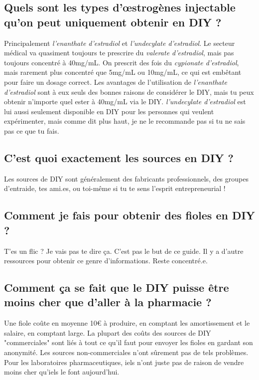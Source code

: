 \documentclass{article}
\begin{document}
\subsection{Quels sont les types d'œstrogènes injectable qu'on peut uniquement obtenir en DIY ?}

Principalement \textit{l'enanthate d'estradiol} et \textit{l'undecylate d'estradiol}. Le secteur médical va quasiment toujours te prescrire du \textit{valerate d'estradiol}, mais pas toujours concentré à 40mg/mL. On prescrit des fois du \textit{cypionate d'estradiol}, mais rarement plus concentré que 5mg/mL ou 10mg/mL, ce qui est embêtant pour faire un dosage correct. Les avantages de l'utilisation de \textit{l'enanthate d'estradiol} sont à eux seuls des bonnes raisons de considérer le DIY, mais tu peux obtenir n'importe quel ester à 40mg/mL via le DIY. \textit{l'undecylate d'estradiol} est lui aussi seulement disponible en DIY pour les personnes qui veulent expérimenter, mais comme dit plus haut, je ne le recommande pas si tu ne sais pas ce que tu fais.

\subsection{C'est quoi exactement les sources en DIY ?}

Les sources de DIY sont généralement des fabricants professionnels, des groupes d'entraide, tes ami.es, ou toi-même si tu te sens l'esprit entrepreneurial !

\subsection{Comment je fais pour obtenir des fioles en DIY ?}

T'es un flic ? Je vais pas te dire ça. C'est pas le but de ce guide. Il y a d'autre ressources pour obtenir ce genre d'informations. Reste concentré.e.

\subsection{Comment ça se fait que le DIY puisse être moins cher que d'aller à la pharmacie ?}

Une fiole coûte en moyenne 10€ à produire, en comptant les amortissement et le salaire, en comptant large. La plupart des coûts des sources de DIY "commerciales" sont liés à tout ce qu'il faut pour envoyer les fioles en gardant son anonymité. Les sources non-commerciales n'ont sûrement pas de tels problèmes. Pour les laboratoires pharmaceutiques, iels n'ont juste pas de raison de vendre moins cher qu'iels le font aujourd'hui.  
\end{document}
